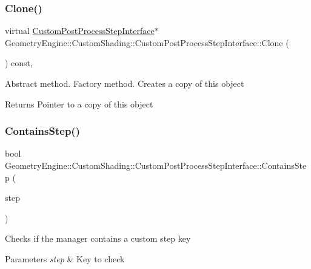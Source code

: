 \subsubsection{\texorpdfstring{Clone()}{Clone()}}
{\footnotesize\ttfamily virtual \mbox{\hyperlink{class_geometry_engine_1_1_custom_shading_1_1_custom_post_process_step_interface}{Custom\+Post\+Process\+Step\+Interface}}$\ast$ Geometry\+Engine\+::\+Custom\+Shading\+::\+Custom\+Post\+Process\+Step\+Interface\+::\+Clone (\begin{DoxyParamCaption}{ }\end{DoxyParamCaption}) const\hspace{0.3cm}{\ttfamily [inline]}, {\ttfamily [virtual]}}

Abstract method. Factory method. Creates a copy of this object \begin{DoxyReturn}{Returns}
Pointer to a copy of this object 
\end{DoxyReturn}
\mbox{\label{class_geometry_engine_1_1_custom_shading_1_1_custom_post_process_step_interface_ac2500c050d94e4d77bb785e8b9322af8}} 
\subsubsection{\texorpdfstring{ContainsStep()}{ContainsStep()}}
{\footnotesize\ttfamily bool Geometry\+Engine\+::\+Custom\+Shading\+::\+Custom\+Post\+Process\+Step\+Interface\+::\+Contains\+Step (\begin{DoxyParamCaption}\item[{const \mbox{\hyperlink{namespace_geometry_engine_1_1_custom_shading_a09e44ca81de5fe08c6d50271d680c4b1}{Custom\+Post\+Process\+Steps}} \&}]{step }\end{DoxyParamCaption})\hspace{0.3cm}{\ttfamily [inline]}}

Checks if the manager contains a custom step key 
\begin{DoxyParams}{Parameters}
{\em step} & Key to check \\
\hline
\end{DoxyParams}
\mbox{\label{class_geometry_engine_1_1_custom_shading_1_1_custom_post_process_step_interface_a9ae01d12255b61cdeb0a1b2e6d9cf785}} 

